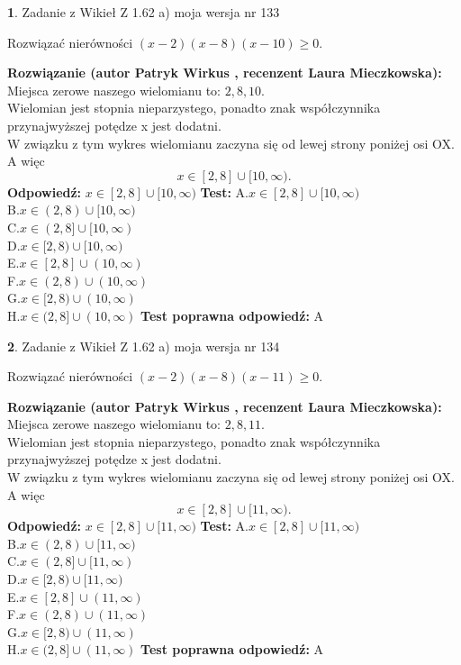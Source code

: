 \documentclass[12pt, a4paper]{article}
\theoremstyle{definition} %
\newtheorem{zad}{}
\newcommand{\zadStart}[1]{\begin{zad}#1\newline}
\newcommand{\zadStop}{\end{zad}}
\newcommand{\rozwStart}[2]{\noindent \textbf{Rozwiązanie (autor #1 , recenzent #2): }\newline}
\newcommand{\rozwStop}{\newline}
\newcommand{\odpStart}{\noindent \textbf{Odpowiedź:}\newline}
\newcommand{\odpStop}{\newline}
\newcommand{\testStart}{\noindent \textbf{Test:}\newline}
\newcommand{\testStop}{\newline}
\newcommand{\kluczStart}{\noindent \textbf{Test poprawna odpowiedź:}\newline}
\newcommand{\kluczStop}{\newline}
\begin{document}
\zadStart{Zadanie z Wikieł Z 1.62 a) moja wersja nr 133}

Rozwiązać nierówności $(x-2)(x-8)(x-10)\ge0$.
\zadStop
\rozwStart{Patryk Wirkus}{Laura Mieczkowska}
Miejsca zerowe naszego wielomianu to: $2, 8, 10$.\\
Wielomian jest stopnia nieparzystego, ponadto znak współczynnika przy\linebreak najwyższej potędze x jest dodatni.\\ W związku z tym wykres wielomianu zaczyna się od lewej strony poniżej osi OX. A więc $$x \in [2,8] \cup [10,\infty).$$
\rozwStop
\odpStart
$x \in [2,8] \cup [10,\infty)$
\odpStop
\testStart
A.$x \in [2,8] \cup [10,\infty)$\\
B.$x \in (2,8) \cup [10,\infty)$\\
C.$x \in (2,8] \cup [10,\infty)$\\
D.$x \in [2,8) \cup [10,\infty)$\\
E.$x \in [2,8] \cup (10,\infty)$\\
F.$x \in (2,8) \cup (10,\infty)$\\
G.$x \in [2,8) \cup (10,\infty)$\\
H.$x \in (2,8] \cup (10,\infty)$
\testStop
\kluczStart
A
\kluczStop



\zadStart{Zadanie z Wikieł Z 1.62 a) moja wersja nr 134}

Rozwiązać nierówności $(x-2)(x-8)(x-11)\ge0$.
\zadStop
\rozwStart{Patryk Wirkus}{Laura Mieczkowska}
Miejsca zerowe naszego wielomianu to: $2, 8, 11$.\\
Wielomian jest stopnia nieparzystego, ponadto znak współczynnika przy\linebreak najwyższej potędze x jest dodatni.\\ W związku z tym wykres wielomianu zaczyna się od lewej strony poniżej osi OX. A więc $$x \in [2,8] \cup [11,\infty).$$
\rozwStop
\odpStart
$x \in [2,8] \cup [11,\infty)$
\odpStop
\testStart
A.$x \in [2,8] \cup [11,\infty)$\\
B.$x \in (2,8) \cup [11,\infty)$\\
C.$x \in (2,8] \cup [11,\infty)$\\
D.$x \in [2,8) \cup [11,\infty)$\\
E.$x \in [2,8] \cup (11,\infty)$\\
F.$x \in (2,8) \cup (11,\infty)$\\
G.$x \in [2,8) \cup (11,\infty)$\\
H.$x \in (2,8] \cup (11,\infty)$
\testStop
\kluczStart
A
\kluczStop
\end{document}
